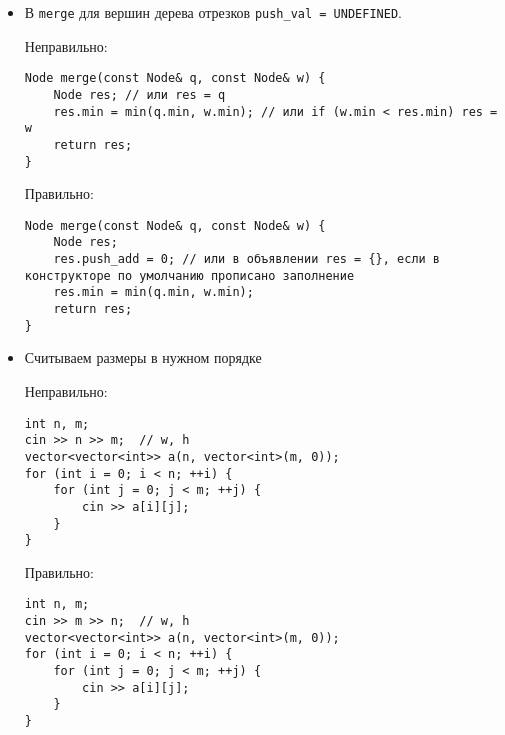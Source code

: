 \begin{itemize}
\item В \texttt{merge} для вершин дерева отрезков \texttt{push\_val = UNDEFINED}.

Неправильно:

\begin{verbatim}
Node merge(const Node& q, const Node& w) {
    Node res; // или res = q
    res.min = min(q.min, w.min); // или if (w.min < res.min) res = w
    return res;
}
\end{verbatim}

Правильно:

\begin{verbatim}
Node merge(const Node& q, const Node& w) {
    Node res;
    res.push_add = 0; // или в объявлении res = {}, если в конструкторе по умолчанию прописано заполнение
    res.min = min(q.min, w.min);
    return res;
}
\end{verbatim}

\item Считываем размеры в нужном порядке

Неправильно:

\begin{verbatim}
int n, m;
cin >> n >> m;  // w, h
vector<vector<int>> a(n, vector<int>(m, 0));
for (int i = 0; i < n; ++i) {
    for (int j = 0; j < m; ++j) {
        cin >> a[i][j];
    }
}
\end{verbatim}

Правильно:

\begin{verbatim}
int n, m;
cin >> m >> n;  // w, h
vector<vector<int>> a(n, vector<int>(m, 0));
for (int i = 0; i < n; ++i) {
    for (int j = 0; j < m; ++j) {
        cin >> a[i][j];
    }
}
\end{verbatim}
\end{itemize}